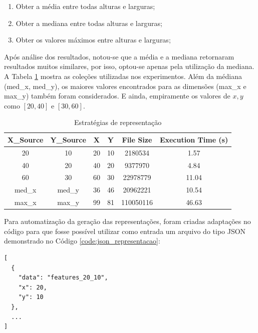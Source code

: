 \documentclass[12pt]{article}
\begin{document}
\begin{enumerate}
  \item Obter a média entre todas alturas e larguras;
  \item Obter a mediana entre todas alturas e larguras;
  \item Obter os valores máximos entre alturas e larguras;
\end{enumerate}

Após análise dos resultados, notou-se que a média e a mediana retornaram resultados muitos similares, por isso, optou-se apenas pela utilização da mediana. A Tabela \ref{tab:estrategias_representacao} mostra as coleções utilizadas nos experimentos. Além da médiana (med\_x, med\_y), os maiores valores encontrados para as dimensões (max\_x e max\_y) também foram considerados. E ainda, empiramente os valores de $x,y$ como $[20,40]$ e $[30,60]$.

\begin{table}[!htb]
  \centering
  \begin{tabular}{|c|c|c|c|c|c|}
  \hline
  \textbf{X\_Source} & \textbf{Y\_Source} & \textbf{X} & \textbf{Y} & \textbf{File Size} & \textbf{Execution Time (s)} \\ \hline
  20                 & 10                 & 20         & 10         & 2180534            & 1.57                    \\ \hline
  40                 & 20                 & 40         & 20         & 9377970            & 4.84                    \\ \hline
  60                 & 30                 & 60         & 30         & 22978779           & 11.04                   \\ \hline
  med\_x             & med\_y             & 36         & 46         & 20962221           & 10.54                   \\ \hline
  max\_x             & max\_y             & 99         & 81         & 110050116          & 46.63                   \\ \hline
  \end{tabular}
  \caption{Estratégias de representação}
  \label{tab:estrategias_representacao}
\end{table}

Para automatização da geração das representações, foram criadas adaptações no código para que fosse possível utilizar como entrada um arquivo do tipo JSON demonstrado no Código \ref{code:json_representacao}:

\begin{lstlisting}[caption={JSON para representações},captionpos=b,frame=single,label={code:json_representacao}]
[
  {
    "data": "features_20_10",
    "x": 20,
    "y": 10
  },
  ...
]
\end{lstlisting}
\end{document}
